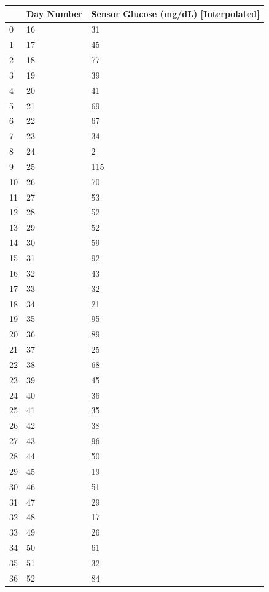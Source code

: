 \bigskip\noindent
\begin{tabular}{p{}p{}p{}}
\toprule
 & Day Number & Sensor Glucose (mg/dL) [Interpolated] \\
\hline
0 & 16 & 31 \\
\hline
1 & 17 & 45 \\
\hline
2 & 18 & 77 \\
\hline
3 & 19 & 39 \\
\hline
4 & 20 & 41 \\
\hline
5 & 21 & 69 \\
\hline
6 & 22 & 67 \\
\hline
7 & 23 & 34 \\
\hline
8 & 24 & 2 \\
\hline
9 & 25 & 115 \\
\hline
10 & 26 & 70 \\
\hline
11 & 27 & 53 \\
\hline
12 & 28 & 52 \\
\hline
13 & 29 & 52 \\
\hline
14 & 30 & 59 \\
\hline
15 & 31 & 92 \\
\hline
16 & 32 & 43 \\
\hline
17 & 33 & 32 \\
\hline
18 & 34 & 21 \\
\hline
19 & 35 & 95 \\
\hline
20 & 36 & 89 \\
\hline
21 & 37 & 25 \\
\hline
22 & 38 & 68 \\
\hline
23 & 39 & 45 \\
\hline
24 & 40 & 36 \\
\hline
25 & 41 & 35 \\
\hline
26 & 42 & 38 \\
\hline
27 & 43 & 96 \\
\hline
28 & 44 & 50 \\
\hline
29 & 45 & 19 \\
\hline
30 & 46 & 51 \\
\hline
31 & 47 & 29 \\
\hline
32 & 48 & 17 \\
\hline
33 & 49 & 26 \\
\hline
34 & 50 & 61 \\
\hline
35 & 51 & 32 \\
\hline
36 & 52 & 84 \\

\end{tabular}
